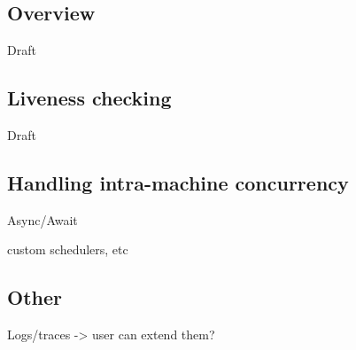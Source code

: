 \subsection{Overview}
\label{sec:psharp:overview}

Draft

\subsection{Liveness checking}
\label{sec:psharp:liveness}

Draft

\subsection{Handling intra-machine concurrency}
\label{sec:psharp:async}

Async/Await

custom schedulers, etc

\subsection{Other}
\label{sec:psharp:other}

Logs/traces -> user can extend them?

